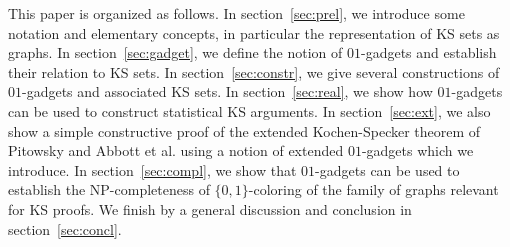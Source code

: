 \documentclass[twocolumn, a4paper, superscriptaddress,nofootinbib, accepted=2020-08-07, hyperref]{quantumarticle}
\def\tred{\textcolor{red}}
\begin{document}


This paper is organized as follows. In section~\ref{sec:prel}, we introduce some notation and elementary concepts, in particular the representation of KS sets as graphs. In section~\ref{sec:gadget}, we define the notion of $01$-gadgets and establish their relation to KS sets. In section~\ref{sec:constr}, we give several constructions of $01$-gadgets and associated KS sets. In section~\ref{sec:real}, we show how $01$-gadgets can be used to construct statistical KS arguments. In section~\ref{sec:ext}, we also show a simple constructive proof of the extended Kochen-Specker theorem of Pitowsky \cite{Pitowsky} and Abbott et al. \cite{ACCS12} using a notion of extended $01$-gadgets which we introduce.  In section~\ref{sec:compl}, we show that $01$-gadgets can be used to establish the NP-completeness of $\{0,1\}$-coloring of the family of graphs relevant for KS proofs. 
We finish by a general discussion and conclusion in section~\ref{sec:concl}. 




\end{document}
